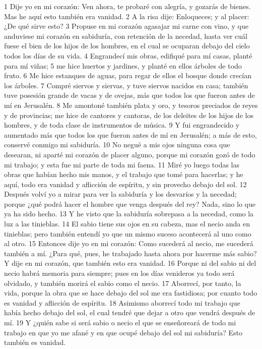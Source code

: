 1 Dije yo en mi corazón: Ven ahora, te probaré con alegría, y gozarás de bienes. Mas he aquí esto también era vanidad.
2 A la risa dije: Enloqueces; y al placer: ¿De qué sirve esto?
3 Propuse en mi corazón agasajar mi carne con vino, y que anduviese mi corazón en sabiduría, con retención de la necedad, hasta ver cuál fuese el bien de los hijos de los hombres, en el cual se ocuparan debajo del cielo todos los días de su vida.
4 Engrandecí mis obras, edifiqué para mí casas, planté para mí viñas;
5 me hice huertos y jardines, y planté en ellos árboles de todo fruto.
6 Me hice estanques de aguas, para regar de ellos el bosque donde crecían los árboles.
7 Compré siervos y siervas, y tuve siervos nacidos en casa; también tuve posesión grande de vacas y de ovejas, más que todos los que fueron antes de mí en Jerusalén.
8 Me amontoné también plata y oro, y tesoros preciados de reyes y de provincias; me hice de cantores y cantoras, de los deleites de los hijos de los hombres, y de toda clase de instrumentos de música. 
9 Y fui engrandecido y aumentado más que todos los que fueron antes de mí en Jerusalén; a más de esto, conservé conmigo mi sabiduría.
10 No negué a mis ojos ninguna cosa que desearan, ni aparté mi corazón de placer alguno, porque mi corazón gozó de todo mi trabajo; y esta fue mi parte de toda mi faena.
11 Miré yo luego todas las obras que habían hecho mis manos, y el trabajo que tomé para hacerlas; y he aquí, todo era vanidad y aflicción de espíritu, y sin provecho debajo del sol.
12 Después volví yo a mirar para ver la sabiduría y los desvaríos y la necedad; porque ¿qué podrá hacer el hombre que venga después del rey? Nada, sino lo que ya ha sido hecho.
13 Y he visto que la sabiduría sobrepasa a la necedad, como la luz a las tinieblas.
14 El sabio tiene sus ojos en su cabeza, mas el necio anda en tinieblas; pero también entendí yo que un mismo suceso acontecerá al uno como al otro.
15 Entonces dije yo en mi corazón: Como sucederá al necio, me sucederá también a mí. ¿Para qué, pues, he trabajado hasta ahora por hacerme más sabio? Y dije en mi corazón, que también esto era vanidad.
16 Porque ni del sabio ni del necio habrá memoria para siempre; pues en los días venideros ya todo será olvidado, y también morirá el sabio como el necio.
17 Aborrecí, por tanto, la vida, porque la obra que se hace debajo del sol me era fastidiosa; por cuanto todo es vanidad y aflicción de espíritu.
18 Asimismo aborrecí todo mi trabajo que había hecho debajo del sol, el cual tendré que dejar a otro que vendrá después de mí.
19 Y ¿quién sabe si será sabio o necio el que se enseñoreará de todo mi trabajo en que yo me afané y en que ocupé debajo del sol mi sabiduría? Esto también es vanidad.
